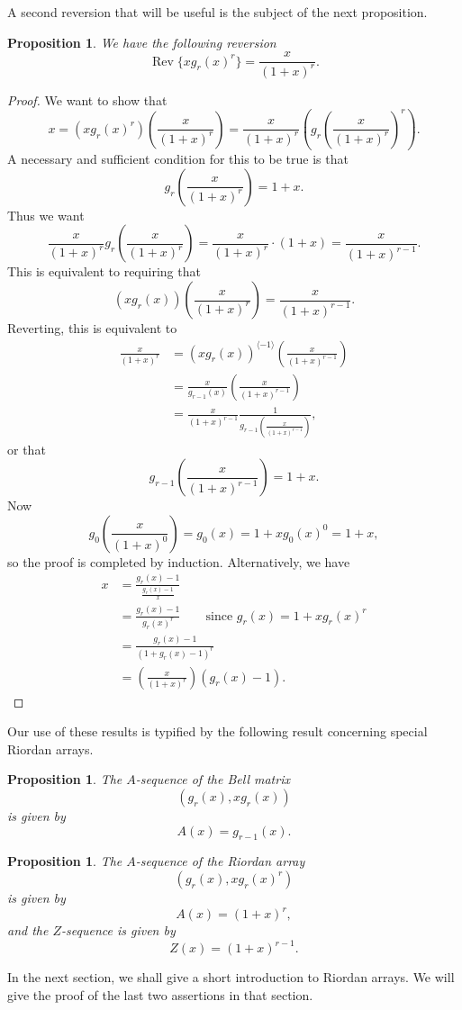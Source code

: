 \documentclass[12pt,reqno]{article}
\newtheorem{proposition}[theorem]{Proposition}
\theoremstyle{definition}
\DeclareMathOperator{\Rev}{Rev}
\begin{document}
A second reversion that will be useful is the subject of the next proposition.
\begin{proposition} We have the following reversion
$$\Rev\{xg_r(x)^r\}=\frac{x}{(1+x)^r}.$$
\end{proposition}
\begin{proof}
We want to show that
$$x=(xg_r(x)^r)\left(\frac{x}{(1+x)^r}\right)=\frac{x}{(1+x)^r}\left(g_r\left(\frac{x}{(1+x)^r}\right)^r\right).$$ A necessary and sufficient condition for this to be true is that
$$g_r\left(\frac{x}{(1+x)^r}\right)=1+x.$$
Thus we want
$$\frac{x}{(1+x)^r}g_r\left(\frac{x}{(1+x)^r}\right)=\frac{x}{(1+x)^r} \cdot (1+x)=\frac{x}{(1+x)^{r-1}}.$$
This is equivalent to requiring that
$$(xg_r(x))\left(\frac{x}{(1+x)^r}\right)=\frac{x}{(1+x)^{r-1}}.$$ Reverting, this is equivalent to
\begin{align*}\frac{x}{(1+x)^r}&=(x g_r(x))^{\langle -1 \rangle}\left(\frac{x}{(1+x)^{r-1}}\right)\\
&=\frac{x}{g_{r-1}(x)}\left(\frac{x}{(1+x)^{r-1}}\right)\\
&=\frac{x}{(1+x)^{r-1}}\frac{1}{g_{r-1}\left(\frac{x}{(1+x)^{r-1}}\right)},\end{align*} or that
$$g_{r-1}\left(\frac{x}{(1+x)^{r-1}}\right)=1+x.$$
Now $$g_0\left(\frac{x}{(1+x)^0}\right)=g_0(x)=1+x g_0(x)^0=1+x,$$ so the proof is completed by induction.
Alternatively, we have 
\begin{align*}
x&=\frac{g_r(x)-1}{\frac{g_r(x)-1}{x}}\\
&=\frac{g_r(x)-1}{g_r(x)^r}\quad\quad \text{since $g_r(x)=1+x g_r(x)^r$}\\
&=\frac{g_r(x)-1}{(1+g_r(x)-1)^r}\\
&= \left(\frac{x}{(1+x)^r}\right)(g_r(x)-1).\end{align*}
\end{proof}
Our use of these results is typified by the following result concerning special Riordan arrays.
\begin{proposition}\label{A_seq1} The $A$-sequence of the Bell matrix
$$\left(g_r(x), xg_r(x)\right)$$ is given by
$$A(x)=g_{r-1}(x).$$
\end{proposition}
\begin{proposition} \label{A_seq2} The $A$-sequence of the Riordan array
$$\left(g_r(x), xg_r(x)^r\right)$$ is given by
$$A(x)=(1+x)^r,$$ and the $Z$-sequence is given by
$$Z(x)=(1+x)^{r-1}.$$
\end{proposition}
In the next section, we shall give a short introduction to Riordan arrays. We will give the proof of the last two assertions in that section.
\end{document}
